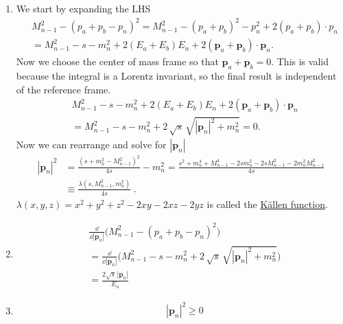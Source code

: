 \begin{enumerate}[label=(\roman*)]
    \item We start by expanding the LHS
    \begin{align*}
        &M_{n-1}^2 - (p_a + p_b - p_n)^2 = M_{n-1}^2 - (p_a + p_b)^2 - p_n^2 + 2(p_a + p_b) \cdot p_n \\
        &= M_{n-1}^2 - s - m_n^2 + 2 (E_a + E_b) E_n + 2 (\bm{p}_a + \bm{p}_b) \cdot \bm{p}_n.
    \end{align*}
    Now we choose the center of mass frame so that $\bm{p}_a + \bm{p}_b = 0$. This is valid because the integral is a Lorentz invariant, so the final result is independent of the reference frame. 
    \begin{align*}
        &M_{n-1}^2 - s - m_n^2 + 2 (E_a + E_b) E_n + 2 (\bm{p}_a + \bm{p}_b) \cdot \bm{p}_n\\
        &=
        M_{n-1}^2 - s - m_n^2 + 2 \, \sqrt{s} \, \sqrt{|\bm{p}_n|^2 + m_n^2} = 0.
    \end{align*}
    Now we can rearrange and solve for $|\bm{p}_n|$
    \begin{align*}
        |\bm{p}_n|^2 
        &=
        \frac{(s + m_n^2 - M_{n-1}^2)^2}{4 s} - m_n^2 = 
        \frac{s^2 + m_n^4 + M_{n-1}^4 - 2 s m_n^2 - 2 s M_{n-1}^2 - 2 m_n^2 M_{n-1}^2}{4 s} \\
        &\equiv \boxed{\frac{\lambda(s, M_{n-1}^2, m_n^2)}{4s}}\;.
    \end{align*}
    $\lambda(x,y,z) = x^2 + y^2 + z^2 - 2xy - 2xz - 2yz$ is called the \href{https://en.wikipedia.org/wiki/K%C3%A4ll%C3%A9n_function}{K\"{a}llen function}.
    \item%
    \begin{align*}
        &\frac{\dd}{\dd |\bm{p}_n|} 
        \bigg( 
            M_{n-1}^2 - (p_a + p_b - p_n)^2
        \bigg)\\
        &= 
        \frac{\dd}{\dd |\bm{p}_n|} 
        \bigg( 
            M_{n-1}^2 - s - m_n^2 + 2 \, \sqrt{s} \, \sqrt{|\bm{p}_n|^2 + m_n^2}
        \bigg)\\
        &=
        \boxed{\frac{2\sqrt{s}\,|\bm{p}_n|}{E_n}}
    \end{align*}
    \item%
    \begin{align*}
        &|\bm{p}_n|^2 \geq 0 \\

\end{align*}
\end{enumerate}
